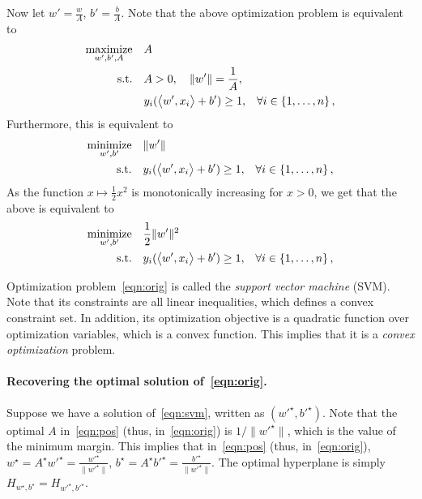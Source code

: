 \documentclass{article}
\DeclareMathOperator*{\maximize}{{\rm maximize}}
\DeclareMathOperator*{\minimize}{{\rm minimize}}
\DeclareMathOperator*{\st}{{\rm s.t.}}
\newcommand{\inner}[2]{\left\langle #1,#2 \right\rangle}
\begin{document}
Now let $w' = \frac{w}{A}$, $b' = \frac{b}{A}$. Note that the above optimization
problem is equivalent to
\begin{align}
  \maximize_{w',b',A} \quad & A & \nonumber \\
    \st \quad & A > 0, \quad \| w' \| = \frac{1}{A}, & \nonumber \\
    &  y_i(\inner{w'}{x_i} + b') \geq 1, &\forall i \in \cbr{1,\ldots,n}, \nonumber
\end{align}
Furthermore, this is equivalent to
\begin{align}
  \minimize_{w',b'} \quad & \| w' \| & \nonumber \\
    \st \quad &  y_i(\inner{w'}{x_i} + b') \geq 1, &\forall i \in \cbr{1,\ldots,n}, \nonumber
\end{align}
As the function $x \mapsto \frac12 x^2$ is monotonically increasing for $x > 0$, we get that the above is
equivalent to
\begin{align}
  \minimize_{w',b'} \quad & \frac12 \| w' \|^2 & \label{eqn:svm} \\
    \st \quad &  y_i(\inner{w'}{x_i} + b') \geq 1, &\forall i \in \cbr{1,\ldots,n}, \nonumber
\end{align}

Optimization problem~\eqref{eqn:orig} is called the {\em support vector machine} (SVM). Note that its constraints are all linear inequalities, which defines a convex constraint set. In addition, its optimization objective is a quadratic function over optimization variables, which is a convex function. This implies that it is a {\em convex optimization} problem.

\paragraph{Recovering the optimal solution of~\eqref{eqn:orig}.} Suppose we have a solution of~\eqref{eqn:svm}, written as $(w'^\star, b'^\star)$. Note that the optimal $A$ in~\eqref{eqn:pos} (thus, in~\eqref{eqn:orig}) is $1/\| w'^\star \|$, which is the value of the minimum margin.
This implies that in~\eqref{eqn:pos} (thus, in~\eqref{eqn:orig}), $w^\star = A^\star w'^\star = \frac{w'^\star}{\|w'^\star\|}$,
$b^\star = A^\star b'^\star = \frac{b'^\star}{\|w'^\star\|}$.
The optimal hyperplane is simply $H_{w^\star,b^\star} = H_{w'^\star, b'^\star}$.
\end{document}
